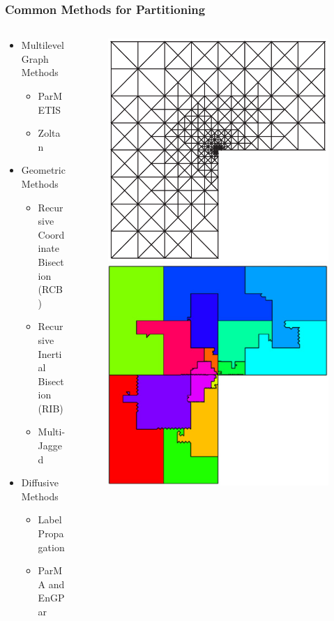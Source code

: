 \documentclass[aspectratio=169]{beamer}
\begin{document}
\begin{frame}
  \frametitle{Common Methods for Partitioning}
  \begin{columns}
    \begin{column}{0.4\textwidth}
      \begin{itemize}
        \item Multilevel Graph Methods %
          \begin{itemize}
            \item ParMETIS
            \item Zoltan
          \end{itemize}
        \item Geometric Methods %
          \begin{itemize}
            \item Recursive Coordinate Bisection (RCB)
            \item Recursive Inertial Bisection (RIB)
            \item Multi-Jagged
          \end{itemize}
        \item Diffusive Methods %
          \begin{itemize}
            \item Label Propagation
            \item ParMA and EnGPar
          \end{itemize}
      \end{itemize}
    \end{column}
    \begin{column}{0.6\textwidth}
      \begin{figure}
        \centering
        \includegraphics[width=.32\textwidth]{figures/mitchellMesh.png}
        \includegraphics[width=.32\textwidth]{figures/mitchellHSFC.png}

\end{figure}
\end{column}
\end{columns}
\end{frame}
\end{document}
